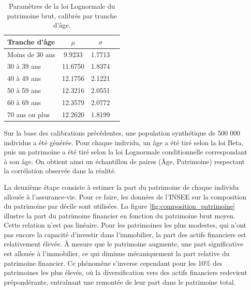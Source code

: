 \begin{table}[H]
\centering
\begin{tabular}{@{}lccc@{}}
\toprule
\textbf{Tranche d'âge} & $\mu$ & $\sigma$ \\
\midrule
Moins de 30 ans & 9.9233 & 1.7713 \\
30 à 39 ans & 11.6750 & 1.8374 \\
40 à 49 ans & 12.1756 & 2.1221 \\
50 à 59 ans & 12.3216 & 2.0551 \\
60 à 69 ans & 12.3579 & 2.0772 \\
70 ans ou plus & 12.2620 & 1.8199 \\
\bottomrule
\end{tabular}
\caption{Paramètres de la loi Lognormale du patrimoine brut, calibrés par tranche d'âge.}
\label{tab:params_patrimoine_age}
\end{table}




Sur la base des calibrations précédentes, une population synthétique de 500 000 individus a été générée. Pour chaque individu, un âge a été tiré selon la loi Beta, puis un patrimoine a été tiré selon la loi Lognormale conditionnelle correspondant à son âge. On obtient ainsi un échantillon de paires (Âge, Patrimoine) respectant la corrélation observée dans la réalité.

La deuxième étape consiste à estimer la part du patrimoine de chaque individu allouée à l'assurance-vie. Pour ce faire, les données de l'INSEE sur la composition du patrimoine par décile \cite{insee_patrimoine_age} sont utilisées. La figure \ref{fig:composition_patrimoine} illustre la part du patrimoine financier en fonction du patrimoine brut moyen. Cette relation n'est pas linéaire. Pour les patrimoines les plus modestes, qui n'ont pas encore la capacité d'investir dans l'immobilier, la part des actifs financiers est relativement élevée. À mesure que le patrimoine augmente, une part significative est allouée à l'immobilier, ce qui diminue mécaniquement la part relative du patrimoine financier. Ce phénomène s'inverse cependant pour les 10\% des patrimoines les plus élevés, où la diversification vers des actifs financiers redevient prépondérante, entraînant une remontée de leur part dans le patrimoine total.

